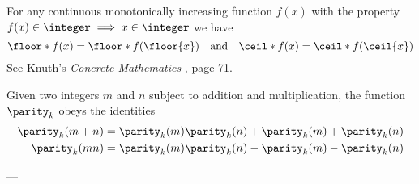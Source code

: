 
\lemma \label{thm:ceil-floor-monotonic} For any continuous monotonically increasing function $f(x)$ with the property $f(x) \in \integer \implies x \in \integer$
we have $$\floor*{f(x)} = \floor*{f(\floor{x})} \quad\text{and}\quad \ceil*{f(x)} = \ceil*{f(\ceil{x})}$$
\proof See Knuth's \emph{Concrete Mathematics} \cite{knuth-graham-patashnik}, page 71.


\lemma Given two integers $m$ and $n$ subject to addition and multiplication, the function $\parity_k$ obeys the identities
\begin{equation}\label{eq:odd-even-props}
\begin{split}
\parity_k(m+n) &= \parity_k(m)\parity_k(n) + \parity_k(m) + \parity_k(n) \\
\parity_k(mn) &= \parity_k(m)\parity_k(n) - \parity_k(m) - \parity_k(n)
\end{split}
\end{equation}

\proof ---